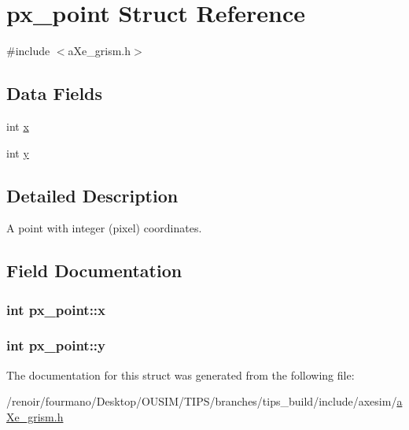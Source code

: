 \hypertarget{structpx__point}{
\section{px\_\-point Struct Reference}
\label{structpx__point}
}


{\ttfamily \#include $<$aXe\_\-grism.h$>$}\subsection*{Data Fields}
\begin{DoxyCompactItemize}
\item 
int \hyperlink{structpx__point_ab715a558731a820a25b50bd7797dd004}{x}
\item 
int \hyperlink{structpx__point_a2d02b900722a71f22a8d5100822bda61}{y}
\end{DoxyCompactItemize}


\subsection{Detailed Description}
A point with integer (pixel) coordinates. 

\subsection{Field Documentation}
\hypertarget{structpx__point_ab715a558731a820a25b50bd7797dd004}{
\subsubsection[{x}]{\setlength{\rightskip}{0pt plus 5cm}int {\bf px\_\-point::x}}}
\label{structpx__point_ab715a558731a820a25b50bd7797dd004}
\hypertarget{structpx__point_a2d02b900722a71f22a8d5100822bda61}{
\subsubsection[{y}]{\setlength{\rightskip}{0pt plus 5cm}int {\bf px\_\-point::y}}}
\label{structpx__point_a2d02b900722a71f22a8d5100822bda61}


The documentation for this struct was generated from the following file:\begin{DoxyCompactItemize}
\item 
/renoir/fourmano/Desktop/OUSIM/TIPS/branches/tips\_\-build/include/axesim/\hyperlink{aXe__grism_8h}{aXe\_\-grism.h}\end{DoxyCompactItemize}
